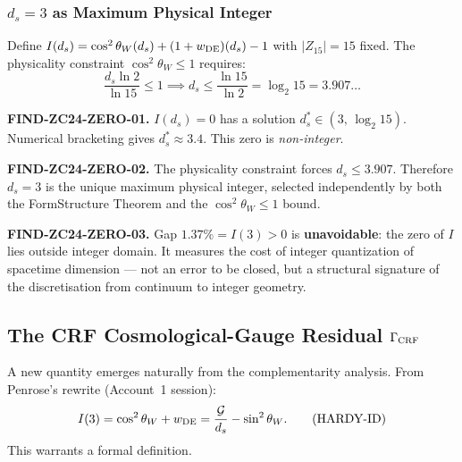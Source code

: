 \documentclass[12pt, a4paper]{article}
\begin{document}
\subsubsection{$d_s = 3$ as Maximum Physical Integer}

Define $I(d_s) = \cos^2\theta_W(d_s) + (1+w_{\rm DE})(d_s) - 1$
with $|Z_{15}|=15$ fixed. The physicality constraint
$\cos^2\theta_W \leq 1$ requires:
\begin{equation}
  \frac{d_s\ln 2}{\ln 15} \leq 1
  \implies d_s \leq \frac{\ln 15}{\ln 2} = \log_2 15 = 3.907\ldots
  \tag{BOUND-ds}\label{zc24:eq:ds-bound}
\end{equation}

\begin{derivedbox}[title={FIND-ZC24-ZERO-01/02/03: Integer
  Quantization Signature}]
\textbf{FIND-ZC24-ZERO-01.}
$I(d_s) = 0$ has a solution $d_s^* \in (3,\,\log_2 15)$.
Numerical bracketing gives $d_s^* \approx 3.4$.
This zero is \emph{non-integer}.

\medskip
\textbf{FIND-ZC24-ZERO-02.}
The physicality constraint forces $d_s \leq 3.907$.
Therefore $d_s = 3$ is the unique maximum physical integer,
selected independently by both the FormStructure Theorem
and the $\cos^2\theta_W \leq 1$ bound.

\medskip
\textbf{FIND-ZC24-ZERO-03.}
Gap $1.37\% = I(3) > 0$ is \textbf{unavoidable}: the zero of
$I$ lies outside integer domain. It measures the cost of
integer quantization of spacetime dimension --- not an error
to be closed, but a structural signature of the discretisation
from continuum to integer geometry.
\end{derivedbox}

\subsection{The CRF Cosmological-Gauge Residual $\Gamma_{\rm CRF}$}
\label{zc24:sec:gamma}

A new quantity emerges naturally from the complementarity
analysis. From Penrose's rewrite (Account~1 session):
\begin{equation}
  I(3) = \cos^2\theta_W + w_{\rm DE}
  = \frac{\mathcal{G}}{d_s} - \sin^2\theta_W.
  \tag{HARDY-ID}
\end{equation}
This warrants a formal definition.
\end{document}
